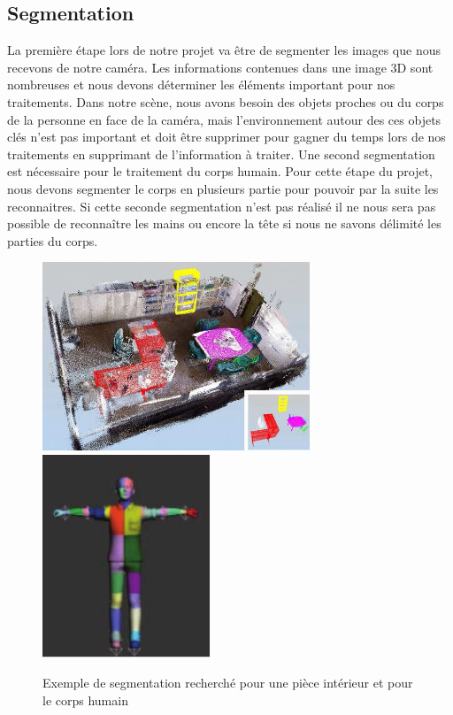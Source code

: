 \subsection{Segmentation}
La première étape lors de notre projet va être de segmenter les images que nous recevons de 
notre caméra. Les informations contenues dans une image 3D sont nombreuses et nous devons
déterminer les éléments important pour nos traitements. Dans notre scène,
nous avons besoin des objets proches ou du corps de la personne en face de la caméra, mais 
l'environnement autour des ces objets clés n'est pas important et doit être supprimer pour
gagner du temps lors de nos traitements en supprimant de l'information à traiter.
Une second segmentation est nécessaire pour le traitement du corps humain. Pour cette étape du projet,
nous devons segmenter le corps en plusieurs partie pour pouvoir par la suite les reconnaitres. Si cette
seconde segmentation n'est pas réalisé il ne nous sera pas possible de reconnaître les mains ou encore
la tête si nous ne savons délimité les parties du corps.  

\begin{figure}[!h]
  \begin{center}
    \includegraphics[width=8cm]{image/segmentation.png}
    \includegraphics[width=5cm]{image/bodySegmentation.png}
    \caption{Exemple de segmentation recherché pour une pièce intérieur et pour le corps humain}
  \end{center}
\end{figure}
 
